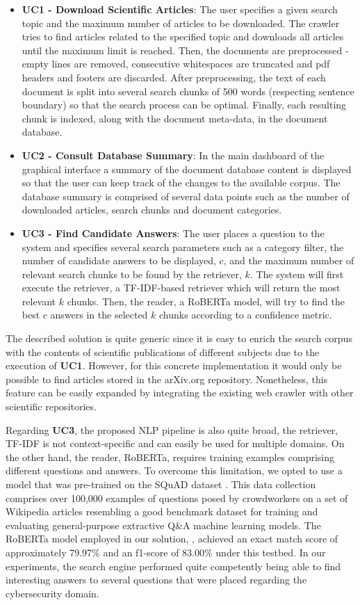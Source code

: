 \documentclass[runningheads]{llncs}
\begin{document}
\begin{itemize}
    \item \textbf{UC1 - Download Scientific Articles}: The user specifies a given search topic and the maximum number of articles to be downloaded. The crawler tries to find articles related to the specified topic and downloads all articles until the maximum limit is reached. Then, the documents are preprocessed - empty lines are removed, consecutive whitespaces are truncated and pdf headers and footers are discarded. After preprocessing, the text of each document is split into several search chunks of 500 words (respecting sentence boundary) so that the search process can be optimal. Finally, each resulting chunk is indexed, along with the document meta-data, in the document database.
    \item \textbf{UC2 - Consult Database Summary}: In the main dashboard of the graphical interface a summary of the document database content is displayed so that the user can keep track of the changes to the available corpus. The database summary is comprised of several data points such as the number of downloaded articles, search chunks and document categories.
    \item \textbf{UC3 - Find Candidate Answers}: The user places a question to the system and specifies several search parameters such as a category filter, the number of candidate answers to be displayed, $c$, and the maximum number of relevant search chunks to be found by the retriever, $k$. The system will first execute the retriever, a TF-IDF-based retriever which will return the most relevant $k$ chunks. Then, the reader, a RoBERTa model, will try to find the best $c$ answers in the selected $k$ chunks according to a confidence metric.
\end{itemize}

The described solution is quite generic since it is easy to enrich the search corpus with the contents of scientific publications of different subjects due to the execution of \textbf{UC1}. However, for this concrete implementation it would only be possible to find articles stored in the arXiv.org repository. Nonetheless, this feature can be easily expanded by integrating the existing web crawler with other scientific repositories. 

Regarding \textbf{UC3}, the proposed NLP pipeline is also quite broad, the retriever, TF-IDF is not context-specific and can easily be used for multiple domains. On the other hand, the reader, RoBERTa, requires training examples comprising different questions and answers. To overcome this limitation, we opted to use a model that was pre-trained on the SQuAD dataset \cite{roberta-deepset}. This data collection comprises over 100,000 examples of questions posed by crowdworkers on a set of Wikipedia articles \cite{squad} resembling a good benchmark dataset for training and evaluating general-purpose extractive Q\&A machine learning models. The RoBERTa model employed in our solution, \cite{roberta-deepset}, achieved an exact match score of approximately 79.97\% and an f1-score of 83.00\% under this testbed. In our experiments, the search engine performed quite competently being able to find interesting answers to several questions that were placed regarding the cybersecurity domain.
\end{document}
